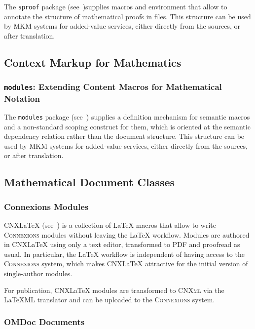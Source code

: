 \documentclass{article}
\makeatletter
\def\ctancitesuffix{:ctan}
\def\ctancite#1{\cite{#1\ctancitesuffix}}
\def\scsys#1{{{\sc #1}}\index{#1@{\sc #1}}}
\def\connexions{\scsys{Connexions}}
\def\latexml{\scsys{LaTeXML}}
\def\connexions{\scshape{Connexions}}
\def\cnxlatex{CNX\LaTeX}
\def\cnxml{\scshape{CNXml}}
\makeatother
\begin{document}
The \texttt{sproof} package (see~\ctancite{Kohlhase:smp})supplies macros and environment
that allow to annotate the structure of mathematical proofs in {\stex} files. This
structure can be used by MKM systems for added-value services, either directly from the
{\sTeX} sources, or after translation.


\subsection{Context Markup for Mathematics}

\subsubsection{{\tt{modules}}: Extending Content Macros for Mathematical Notation}
 
The \texttt{modules} package (see~\ctancite{KohAmb:smmssl}) supplies a definition
mechanism for semantic macros and a non-standard scoping construct for them, which is
oriented at the semantic dependency relation rather than the document structure. This
structure can be used by MKM systems for added-value services, either directly from the
{\sTeX} sources, or after translation.

\subsection{Mathematical Document Classes}

\subsubsection{Connexions Modules}

{\cnxlatex} (see~\ctancite{Kohlhase:clbscm}) is a collection of {\LaTeX} macros that allow
to write {\connexions} modules without leaving the {\LaTeX} workflow. Modules are authored
in {\cnxlatex} using only a text editor, transformed to PDF and proofread as usual. In
particular, the {\LaTeX} workflow is independent of having access to the {\connexions}
system, which makes {\cnxlatex} attractive for the initial version of single-author
modules.


For publication, {\cnxlatex} modules are transformed to {\cnxml} via the {\latexml}
translator and can be uploaded to the {\connexions} system.

\subsubsection{OMDoc Documents}
\end{document}

